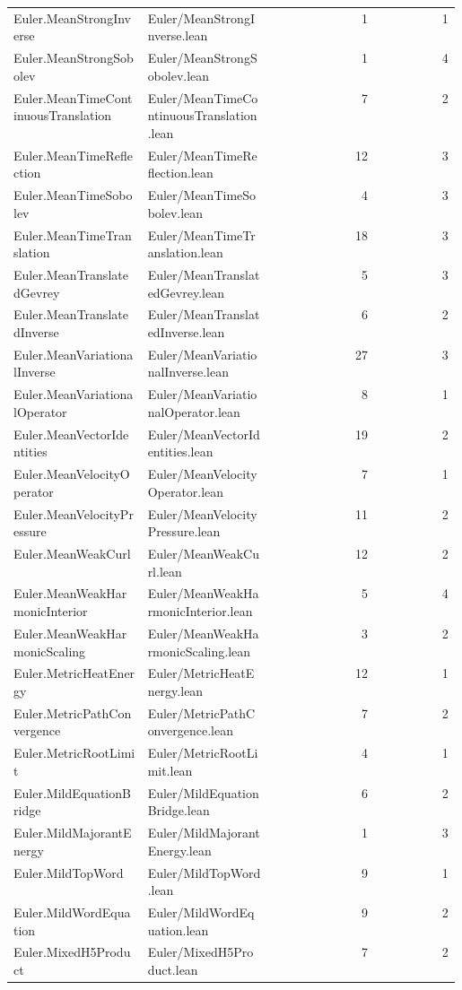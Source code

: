 \begin{longtable}{p{0.30\linewidth}p{0.28\linewidth}rr}
Euler.MeanStrongInverse & Euler/MeanStrongInverse.lean & 1 & 1\\
Euler.MeanStrongSobolev & Euler/MeanStrongSobolev.lean & 1 & 4\\
Euler.MeanTimeContinuousTranslation & Euler/MeanTimeContinuousTranslation.lean & 7 & 2\\
Euler.MeanTimeReflection & Euler/MeanTimeReflection.lean & 12 & 3\\
Euler.MeanTimeSobolev & Euler/MeanTimeSobolev.lean & 4 & 3\\
Euler.MeanTimeTranslation & Euler/MeanTimeTranslation.lean & 18 & 3\\
Euler.MeanTranslatedGevrey & Euler/MeanTranslatedGevrey.lean & 5 & 3\\
Euler.MeanTranslatedInverse & Euler/MeanTranslatedInverse.lean & 6 & 2\\
Euler.MeanVariationalInverse & Euler/MeanVariationalInverse.lean & 27 & 3\\
Euler.MeanVariationalOperator & Euler/MeanVariationalOperator.lean & 8 & 1\\
Euler.MeanVectorIdentities & Euler/MeanVectorIdentities.lean & 19 & 2\\
Euler.MeanVelocityOperator & Euler/MeanVelocityOperator.lean & 7 & 1\\
Euler.MeanVelocityPressure & Euler/MeanVelocityPressure.lean & 11 & 2\\
Euler.MeanWeakCurl & Euler/MeanWeakCurl.lean & 12 & 2\\
Euler.MeanWeakHarmonicInterior & Euler/MeanWeakHarmonicInterior.lean & 5 & 4\\
Euler.MeanWeakHarmonicScaling & Euler/MeanWeakHarmonicScaling.lean & 3 & 2\\
Euler.MetricHeatEnergy & Euler/MetricHeatEnergy.lean & 12 & 1\\
Euler.MetricPathConvergence & Euler/MetricPathConvergence.lean & 7 & 2\\
Euler.MetricRootLimit & Euler/MetricRootLimit.lean & 4 & 1\\
Euler.MildEquationBridge & Euler/MildEquationBridge.lean & 6 & 2\\
Euler.MildMajorantEnergy & Euler/MildMajorantEnergy.lean & 1 & 3\\
Euler.MildTopWord & Euler/MildTopWord.lean & 9 & 1\\
Euler.MildWordEquation & Euler/MildWordEquation.lean & 9 & 2\\
Euler.MixedH5Product & Euler/MixedH5Product.lean & 7 & 2\\

\end{longtable}
